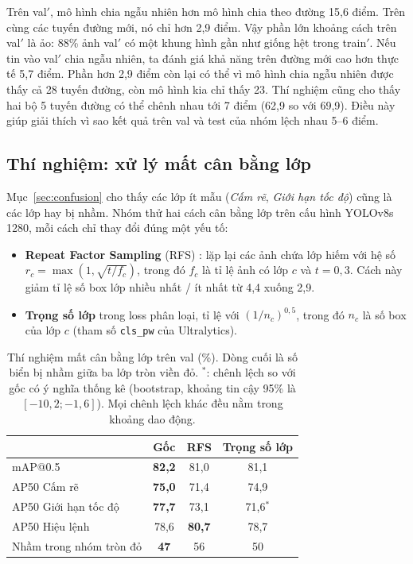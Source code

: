 Trên val$'$, mô hình chia ngẫu nhiên hơn mô hình chia theo đường 15,6 điểm. Trên cùng các tuyến đường mới, nó chỉ hơn 2,9 điểm.
Vậy phần lớn khoảng cách trên val$'$ là ảo: 88\% ảnh val$'$ có một khung hình gần như giống hệt trong train$'$.
Nếu tin vào val$'$ chia ngẫu nhiên, ta đánh giá khả năng trên đường mới cao hơn thực tế 5,7 điểm.
Phần hơn 2,9 điểm còn lại có thể vì mô hình chia ngẫu nhiên được thấy cả 28 tuyến đường, còn mô hình kia chỉ thấy 23.
Thí nghiệm cũng cho thấy hai bộ 5 tuyến đường có thể chênh nhau tới 7 điểm (62,9 so với 69,9). Điều này giúp giải thích vì sao kết quả trên val và test của nhóm lệch nhau 5--6 điểm.

\subsection{Thí nghiệm: xử lý mất cân bằng lớp}
\label{sec:imbalance}

Mục~\ref{sec:confusion} cho thấy các lớp ít mẫu (\textit{Cấm rẽ}, \textit{Giới hạn tốc độ}) cũng là các lớp hay bị nhầm. Nhóm thử hai cách cân bằng lớp trên cấu hình YOLOv8s 1280, mỗi cách chỉ thay đổi đúng một yếu tố:
\begin{itemize}
\item \textbf{Repeat Factor Sampling} (RFS) \citep{gupta2019lvis}: lặp lại các ảnh chứa lớp hiếm với hệ số $r_c = \max(1, \sqrt{t/f_c})$, trong đó $f_c$ là tỉ lệ ảnh có lớp $c$ và $t = 0{,}3$. Cách này giảm tỉ lệ số box lớp nhiều nhất / ít nhất từ 4,4 xuống 2,9.
\item \textbf{Trọng số lớp} trong loss phân loại, tỉ lệ với $(1/n_c)^{0{,}5}$, trong đó $n_c$ là số box của lớp $c$ (tham số \texttt{cls\_pw} của Ultralytics).
\end{itemize}

\begin{table}[t]
\centering
\small
\begin{tabular}{lccc}
\toprule
& Gốc & RFS & Trọng số lớp \\
\midrule
mAP@0.5          & \textbf{82,2} & 81,0 & 81,1 \\
AP50 Cấm rẽ          & \textbf{75,0} & 71,4 & 74,9 \\
AP50 Giới hạn tốc độ & \textbf{77,7} & 73,1 & 71,6$^{*}$ \\
AP50 Hiệu lệnh       & 78,6 & \textbf{80,7} & 78,7 \\
Nhầm trong nhóm tròn đỏ & \textbf{47} & 56 & 50 \\
\bottomrule
\end{tabular}
\caption{Thí nghiệm mất cân bằng lớp trên val (\%). Dòng cuối là số biển bị nhầm giữa ba lớp tròn viền đỏ. $^{*}$: chênh lệch so với gốc có ý nghĩa thống kê (bootstrap, khoảng tin cậy 95\% là $[-10{,}2; -1{,}6]$). Mọi chênh lệch khác đều nằm trong khoảng dao động.}
\label{tab:imbalance}
\end{table}

